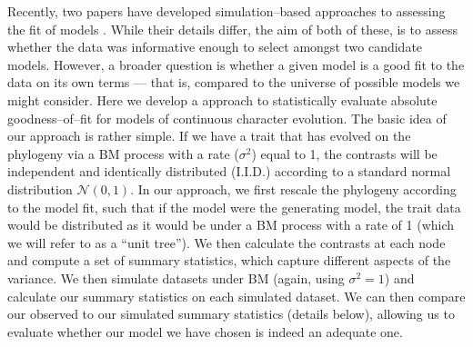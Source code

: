 \documentclass[a4paper,12pt]{article}
\begin{document}
Recently, two papers have developed simulation--based approaches to assessing the fit of models \citep{Boettiger2012, SlaterPennell}. While their details differ, the aim of both of these, is to assess whether the data was informative enough to select amongst two candidate models. However, a broader question is whether a given model is a good fit to the data on its own terms --- that is, compared to the universe of possible models we might consider. Here we develop a approach to statistically evaluate absolute goodness--of--fit for models of continuous character evolution. The basic idea of our approach is rather simple. If we have a trait that has evolved on the phylogeny via a BM process with a rate ($\sigma^2$) equal to 1, the contrasts \citep[\textit{sensu}][see below]{Felsenstein1985} will be independent and identically distributed (I.I.D.) according to a standard normal distribution $\mathcal{N}(0,1)$. In our approach, we first rescale the phylogeny according to the model fit, such that if the model were the generating model, the trait data would be distributed as it would be under a BM process with a rate of 1 (which we will refer to as a ``unit tree''). We then calculate the contrasts at each node and compute a set of summary statistics, which capture different aspects of the variance. We then simulate datasets under BM (again, using $\sigma^2 = 1$) and calculate our summary statistics on each simulated dataset. We can then compare our observed to our simulated summary statistics (details below), allowing us to evaluate whether our model we have chosen is indeed an adequate one. 


\end{document}
